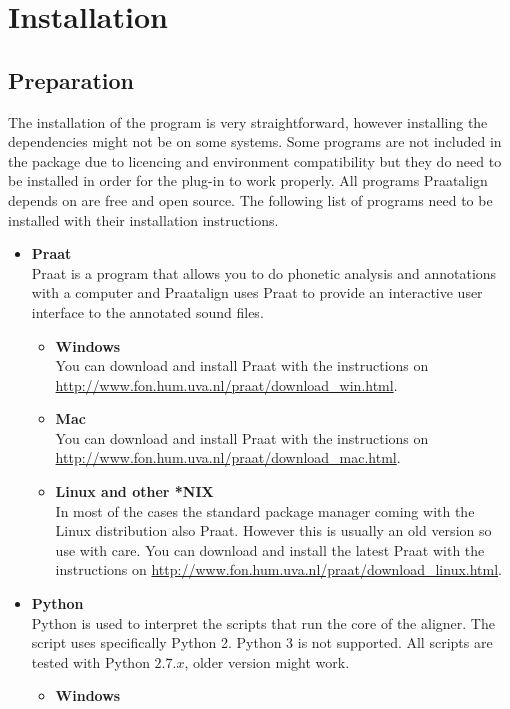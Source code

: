 \chapter{Installation}
\section{Preparation}
The installation of the program is very straightforward, however installing the
dependencies might not be on some systems. Some programs are not included in
the package due to licencing and environment compatibility but they do need to
be installed in order for the plug-in to work properly. All programs Praatalign
depends on are free and open source. The following list of programs need to be
installed with their installation instructions.
\begin{itemize}
	\item \textbf{Praat}\\
		Praat is a program that allows you to do phonetic analysis and annotations
		with a computer and Praatalign uses Praat to provide an interactive user
		interface to the annotated sound files.
		\begin{itemize}
			\item \textbf{Windows}\\
				You can download and install Praat with the instructions on
				\url{http://www.fon.hum.uva.nl/praat/download_win.html}.
			\item \textbf{Mac}\\
				You can download and install Praat with the instructions on
				\url{http://www.fon.hum.uva.nl/praat/download_mac.html}.
			\item \textbf{Linux and other *NIX}\\
				In most of the cases the standard package manager coming with the
				Linux distribution also Praat. However this is usually an old version
				so use with care. You can download and install the latest Praat with
				the instructions on
				\url{http://www.fon.hum.uva.nl/praat/download_linux.html}.
		\end{itemize}
	\item \textbf{Python}\\
		Python is used to interpret the scripts that run the core of the aligner.
		The script uses specifically Python 2. Python 3 is not supported. All
		scripts are tested with Python $2.7.x$, older version might work.
		\begin{itemize}
			\item \textbf{Windows}\\

\end{itemize}
\end{itemize}
